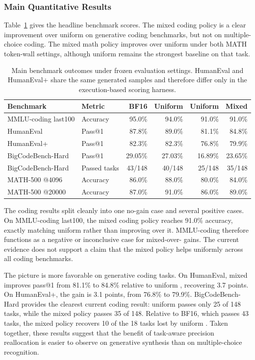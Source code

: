 \subsubsection{Main Quantitative Results}

Table~\ref{tab:results-main-summary} gives the headline benchmark scores. The mixed coding policy is a clear improvement over uniform \intfour{} on generative coding benchmarks, but not on multiple-choice coding. The mixed math policy improves over uniform \intfour{} under both MATH token-wall settings, although uniform \inteight{} remains the strongest baseline on that task.

\begin{table}[t]
\centering
\caption{Main benchmark outcomes under frozen evaluation settings. HumanEval and HumanEval+ share the same generated samples and therefore differ only in the execution-based scoring harness.}
\label{tab:results-main-summary}
\footnotesize
\begin{tabular}{llrrrr}
\toprule
Benchmark & Metric & BF16 & Uniform \inteight{} & Uniform \intfour{} & Mixed \\
\midrule
MMLU-coding last100 & Accuracy & 95.0\% & 94.0\% & 91.0\% & 91.0\% \\
HumanEval & Pass@1 & 87.8\% & 89.0\% & 81.1\% & 84.8\% \\
HumanEval+ & Pass@1 & 82.3\% & 82.3\% & 76.8\% & 79.9\% \\
BigCodeBench-Hard & Pass@1 & 29.05\% & 27.03\% & 16.89\% & 23.65\% \\
BigCodeBench-Hard & Passed tasks & 43/148 & 40/148 & 25/148 & 35/148 \\
MATH-500 @4096 & Accuracy & 86.0\% & 88.0\% & 80.0\% & 84.0\% \\
MATH-500 @20000 & Accuracy & 87.0\% & 91.0\% & 86.0\% & 89.0\% \\
\bottomrule
\end{tabular}
\end{table}

The coding results split cleanly into one no-gain case and several positive cases. On MMLU-coding last100, the mixed coding policy reaches 91.0\% accuracy, exactly matching uniform \intfour{} rather than improving over it. MMLU-coding therefore functions as a negative or inconclusive case for mixed-over-\intfour{} gains. The current evidence does not support a claim that the mixed policy helps uniformly across all coding benchmarks.

The picture is more favorable on generative coding tasks. On HumanEval, mixed improves pass@1 from 81.1\% to 84.8\% relative to uniform \intfour{}, recovering 3.7 points. On HumanEval+, the gain is 3.1 points, from 76.8\% to 79.9\%. BigCodeBench-Hard provides the clearest current coding result: uniform \intfour{} passes only 25 of 148 tasks, while the mixed policy passes 35 of 148. Relative to BF16, which passes 43 tasks, the mixed policy recovers 10 of the 18 tasks lost by uniform \intfour{}. Taken together, these results suggest that the benefit of task-aware precision reallocation is easier to observe on generative synthesis than on multiple-choice recognition.

